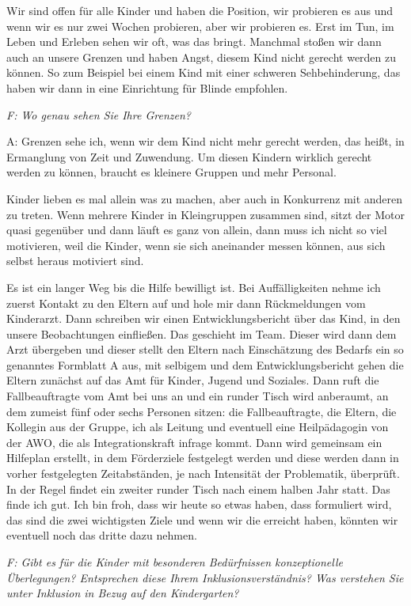 Wir sind offen für alle Kinder und haben die Position, wir probieren es aus und wenn wir es nur zwei Wochen probieren, aber wir probieren es. Erst im Tun, im Leben und Erleben sehen wir oft, was das bringt. Manchmal stoßen wir dann auch an unsere Grenzen und haben Angst, diesem Kind nicht gerecht werden zu können. So zum Beispiel bei einem Kind mit einer schweren Sehbehinderung, das haben wir dann in eine Einrichtung für Blinde empfohlen. 

\emph{F: Wo genau sehen Sie Ihre Grenzen?}

A: Grenzen sehe ich, wenn wir dem Kind nicht mehr gerecht werden, das heißt, in Ermanglung von Zeit und Zuwendung. Um diesen Kindern wirklich gerecht werden zu können, braucht es kleinere Gruppen und mehr Personal. 

Kinder lieben es mal allein was zu machen, aber auch in Konkurrenz mit anderen zu treten. Wenn mehrere Kinder in Kleingruppen zusammen sind, sitzt der Motor quasi gegenüber und dann läuft es ganz von allein, dann muss ich nicht so viel motivieren, weil die Kinder, wenn sie sich aneinander messen können, aus sich selbst heraus motiviert sind.

Es ist ein langer Weg bis die Hilfe bewilligt ist. Bei Auffälligkeiten nehme ich zuerst Kontakt zu den Eltern auf und hole mir dann Rückmeldungen vom Kinderarzt. Dann schreiben wir einen Entwicklungsbericht über das Kind, in den unsere Beobachtungen einfließen. Das geschieht im Team. Dieser wird dann dem Arzt übergeben und dieser stellt den Eltern nach Einschätzung des Bedarfs ein so genanntes Formblatt A aus, mit selbigem und dem Entwicklungsbericht gehen die Eltern zunächst auf das Amt für Kinder, Jugend und Soziales. Dann ruft die Fallbeauftragte vom Amt bei uns an und ein runder Tisch wird anberaumt, an dem zumeist fünf oder sechs Personen sitzen: die Fallbeauftragte, die Eltern, die Kollegin aus der Gruppe, ich als Leitung und eventuell eine Heilpädagogin von der AWO, die als Integrationskraft infrage kommt. 
Dann wird gemeinsam ein Hilfeplan erstellt, in dem Förderziele festgelegt werden und diese werden dann in vorher festgelegten Zeitabständen, je nach Intensität der Problematik, überprüft. In der Regel findet ein zweiter runder Tisch nach einem halben Jahr statt. Das finde ich gut. Ich bin froh, dass wir heute so etwas haben, dass  formuliert wird, das sind die zwei wichtigsten Ziele und wenn wir die erreicht haben, könnten wir eventuell noch das dritte dazu nehmen. 

\emph{F: Gibt es für die Kinder mit besonderen Bedürfnissen konzeptionelle Überlegungen? Entsprechen diese Ihrem Inklusionsverständnis?
Was verstehen Sie unter Inklusion in Bezug auf den Kindergarten?} 

